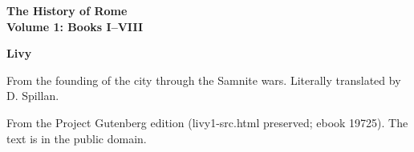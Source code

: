 \documentclass[11pt,letterpaper]{article}
\begin{document}
\color{ink}

\begin{titlepage}
\centering
\vspace*{4em}
{\LARGE\bfseries\color{heading} The History of Rome\\[0.3em]Volume 1: Books I--VIII\par}
\vspace{2em}
{\Large\bfseries\color{heading} Livy\par}
\vspace{2.5em}
{\itshape\color{subhead}\parbox{0.8\linewidth}{\centering From the founding of the city through the Samnite wars. Literally translated by D. Spillan.\par}}
\vfill
{\small From the Project Gutenberg edition (livy1-src.html preserved; ebook 19725). The text is in the public domain.\par}
\vspace{2em}
\end{titlepage}

\tableofcontents


\end{document}
